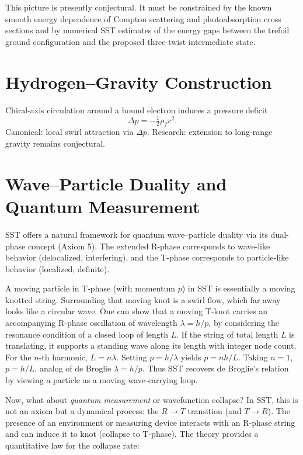\documentclass[10pt,reprint,aps,onecolumn,nofootinbib]{revtex4-2}
\newcommand{\rhof}{\rho_{\!f}}                           %
\begin{document}
    This picture is presently conjectural.  It must be constrained by the
    known smooth energy dependence of Compton scattering and
    photoabsorption cross sections and by numerical SST estimates of the
    energy gaps between the trefoil ground configuration and the proposed
    three-twist intermediate state.


\section{Hydrogen--Gravity Construction}\label{canon58:hydro-grav}
Chiral-axis circulation around a bound electron induces a pressure deficit
\[
    \Delta p = -\tfrac12 \rhof v^2.
\]
Canonical: local swirl attraction via $\Delta p$. %
Research: extension to long-range gravity remains conjectural. %


\section{Wave–Particle Duality and Quantum Measurement}
SST offers a natural framework for quantum wave–particle duality via its dual-phase concept (Axiom 5). The extended R-phase corresponds to wave-like behavior (delocalized, interfering), and the T-phase corresponds to particle-like behavior (localized, definite).

A moving particle in T-phase (with momentum $p$) in SST is essentially a moving knotted string. Surrounding that moving knot is a swirl flow, which far away looks like a circular wave. One can show that a moving T-knot carries an accompanying R-phase oscillation of wavelength $\lambda = h/p$, by considering the resonance condition of a closed loop of length $L$. If the string of total length $L$ is translating, it supports a standing wave along its length with integer node count. For the $n$-th harmonic, $L = n \lambda$. Setting $p = h/\lambda$ yields $p = n h/L$. Taking $n=1$, $p = h/L$, analog of de Broglie $\lambda = h/p$. Thus SST recovers de Broglie’s relation by viewing a particle as a moving wave-carrying loop.

Now, what about \emph{quantum measurement} or wavefunction collapse? In SST, this is not an axiom but a dynamical process: the $R\to T$ transition (and $T\to R$). The presence of an environment or measuring device interacts with an R-phase string and can induce it to knot (collapse to T-phase). The theory provides a quantitative law for the collapse rate:
\end{document}
